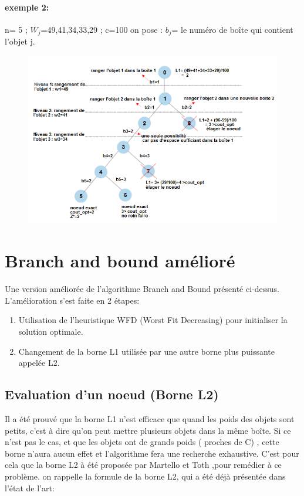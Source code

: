 \documentclass[12pt]{article}
\begin{document}
\paragraph{exemple 2: }
n= 5 ; $W_{j}$={49,41,34,33,29} ; c=100 
on pose : $b_j$= le numéro de boîte qui contient l’objet j.

\begin{figure}[h!]
    \includegraphics[width=\linewidth]{../figures/diag2.png}
\end{figure}
\section{Branch and bound amélioré}
Une version améliorée de l’algorithme Branch and Bound présenté ci-dessus. L’amélioration s’est faite en 2 étapes: 
\begin{enumerate}
    \item Utilisation de l’heuristique WFD (Worst Fit Decreasing) pour initialiser la solution optimale.
    \item Changement de la borne L1 utilisée par une autre borne plus puissante appelée L2. 
\end{enumerate}
\subsection*{Evaluation d'un noeud (Borne L2)}
Il a été prouvé que la borne L1 n’est efficace que quand les poids des objets sont petits, c’est à dire qu’on peut mettre plusieurs objets dans la même boîte. Si ce n’est pas le cas, et que les objets ont de grands poids ( proches de C) , cette borne n’aura aucun effet et l’algorithme fera une recherche exhaustive. 
C’est pour cela que la borne L2 à été proposée par Martello et Toth ,pour remédier à ce problème. 
on rappelle la formule de la borne L2, qui a été déjà présentée dans l’état de l’art:
\end{document}
